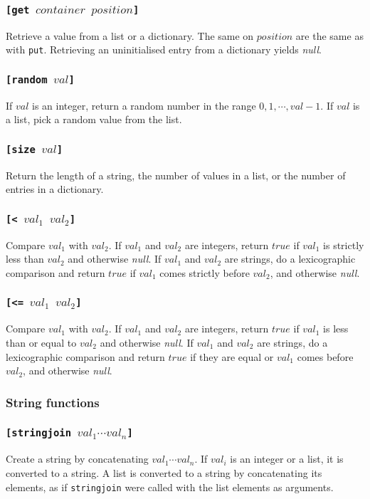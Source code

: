 \documentclass[11pt]{report}
\begin{document}
\subsubsection*{\tt{[get }$container$ $position$\tt{]}}
Retrieve a value from a list or a dictionary. The same on $position$ are the same as with \verb|put|. Retrieving an uninitialised entry from a dictionary yields \textit{null}.
\subsubsection*{\tt{[random }$val$\tt{]}}
If $val$ is an integer, return a random number in the range $0,1, \cdots, val -1$. If $val$ is a list, pick a random value from the list.
\subsubsection*{\tt{[size }$val$\tt{]}}
Return the length of a string, the number of values in a list, or the number of entries in a dictionary.
\subsubsection*{\tt{[< }$val_1$ $val_2$\tt{]}}
Compare $val_1$ with $val_2$. If $val_1$ and $val_2$ are integers, return $true$ if $val_1$ is strictly less than $val_2$ and otherwise \textit{null}.
If $val_1$ and $val_2$ are strings, do a lexicographic comparison and return $true$ if $val_1$ comes strictly before $val_2$, and otherwise \textit{null}.
\subsubsection*{\tt{[<= }$val_1$ $val_2$\tt{]}}
Compare $val_1$ with $val_2$. If $val_1$ and $val_2$ are integers, return $true$ if $val_1$ is less than or equal to $val_2$ and otherwise \textit{null}.
If $val_1$ and $val_2$ are strings, do a lexicographic comparison and return $true$ if they are equal or $val_1$ comes before $val_2$, and otherwise \textit{null}.

\subsubsection{String functions}
\subsubsection*{\tt{[stringjoin }$val_1\cdots val_n$\tt{]}}
Create a string by concatenating $val_1\cdots val_n$.
If $val_i$ is an integer or a list, it is converted to a string.
A list is converted to a string by concatenating its elements, as if {\tt stringjoin} were called with the list elements as arguments.
\end{document}
